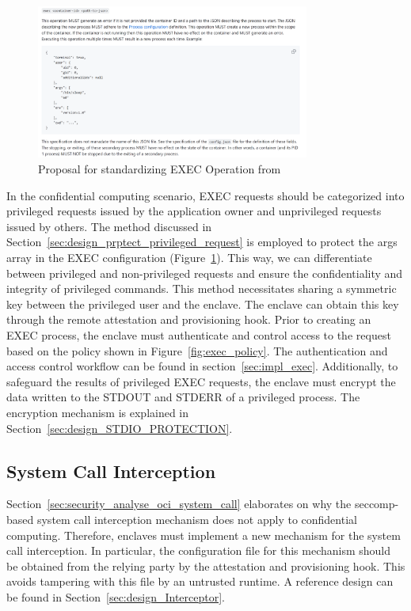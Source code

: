\begin{figure}[!htb]
    \centering
    \includegraphics[width=0.8\textwidth]{images/exec_propose.png}
    \caption[Proposal for standardizing EXEC operation]{Proposal for standardizing EXEC Operation from~\cite*{exec_proposal}}
    \label{fig:exec_propose}
\end{figure}
 
In the confidential computing scenario, EXEC requests should be categorized into privileged requests issued by the application owner and unprivileged requests issued by others. The method discussed in Section~\ref{sec:design_prptect_privileged_request} is employed to protect the args array in the EXEC configuration (Figure~\ref{fig:exec_propose}). This way, 
we can differentiate between privileged and non-privileged requests and ensure the confidentiality and integrity of privileged commands. This method necessitates sharing a symmetric key between the privileged user and the enclave. The enclave can obtain this key through the remote attestation and provisioning hook. Prior to creating an EXEC process,
the enclave must authenticate and control access to the request based on the policy shown in Figure~\ref{fig:exec_policy}. The authentication and access control workflow can be found in section~\ref{sec:impl_exec}. Additionally, to safeguard the results of privileged EXEC requests, the enclave must encrypt the data written to the STDOUT and STDERR of a 
privileged process. The encryption mechanism is explained in Section~\ref{sec:design_STDIO_PROTECTION}.


\subsection{System Call Interception}
Section~\ref{sec:security_analyse_oci_system_call} elaborates on why the seccomp-based system call interception mechanism does not apply to confidential computing. Therefore, enclaves must implement a new mechanism for the system call interception. In particular, the configuration file for this 
mechanism should be obtained from the relying party by the attestation and provisioning hook. This avoids tampering with this file by an untrusted runtime. A reference design can be found in Section~\ref{sec:design_Interceptor}.


